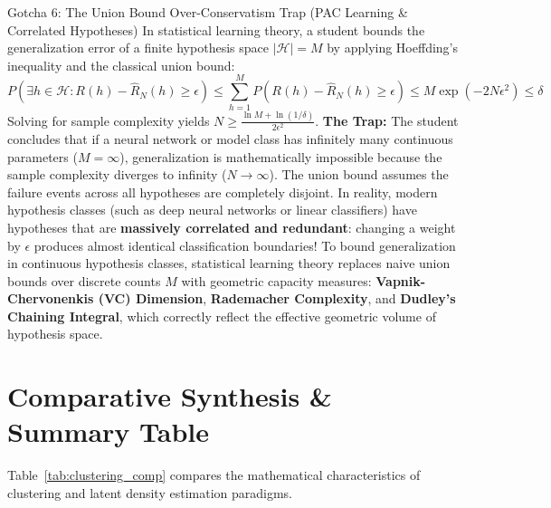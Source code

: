\begin{trapbox}{Gotcha 6: The Union Bound Over-Conservatism Trap (PAC Learning \& Correlated Hypotheses)}
In statistical learning theory, a student bounds the generalization error of a finite hypothesis space $|\mathcal{H}| = M$ by applying Hoeffding's inequality and the classical union bound:
\begin{equation*}
P\left( \exists h \in \mathcal{H} : R(h) - \hat{R}_N(h) \ge \epsilon \right) \le \sum_{h=1}^M P\left( R(h) - \hat{R}_N(h) \ge \epsilon \right) \le M \exp\left( -2N\epsilon^2 \right) \le \delta
\end{equation*}
Solving for sample complexity yields $N \ge \frac{\ln M + \ln(1/\delta)}{2\epsilon^2}$.
\textbf{The Trap:} The student concludes that if a neural network or model class has infinitely many continuous parameters ($M = \infty$), generalization is mathematically impossible because the sample complexity diverges to infinity ($N \to \infty$).
The union bound assumes the failure events across all hypotheses are completely disjoint. In reality, modern hypothesis classes (such as deep neural networks or linear classifiers) have hypotheses that are \textbf{massively correlated and redundant}: changing a weight by $\epsilon$ produces almost identical classification boundaries!
To bound generalization in continuous hypothesis classes, statistical learning theory replaces naive union bounds over discrete counts $M$ with geometric capacity measures: \textbf{Vapnik-Chervonenkis (VC) Dimension}, \textbf{Rademacher Complexity}, and \textbf{Dudley's Chaining Integral}, which correctly reflect the effective geometric volume of hypothesis space.
\end{trapbox}

\section{Comparative Synthesis \& Summary Table}

Table~\ref{tab:clustering_comp} compares the mathematical characteristics of clustering and latent density estimation paradigms.

